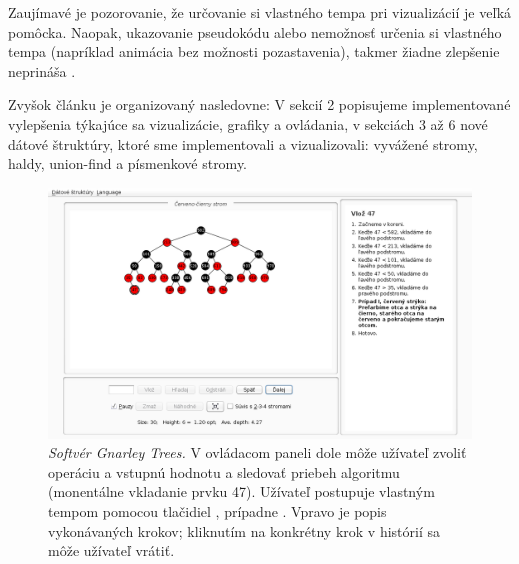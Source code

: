 Zaujímavé je pozorovanie, že určovanie si vlastného tempa pri vizualizácií 
je veľká pomôcka. Naopak, ukazovanie pseudokódu alebo nemožnosť určenia si
vlastného tempa (napríklad animácia bez možnosti pozastavenia), takmer 
žiadne zlepšenie neprináša \citep{shaffer,saraiya}.

Zvyšok článku je organizovaný nasledovne: V sekcií 2 popisujeme implementované
vylepšenia týkajúce sa vizualizácie, grafiky a ovládania, v sekciách 3 až 6
nové dátové štruktúry, ktoré sme implementovali a vizualizovali: vyvážené
stromy, haldy, union-find a písmenkové stromy.

\begin{figure}
\centering
\includegraphics[width=2.01\columnwidth]{obrazky/gt.png}
\caption{\emph{Softvér Gnarley Trees.} V ovládacom paneli dole môže užívateľ
zvoliť operáciu a vstupnú hodnotu a sledovať priebeh algoritmu (monentálne vkladanie
prvku 47). Užívateľ postupuje vlastným tempom  pomocou tlačidiel , prípadne
. Vpravo je popis vykonávaných krokov; kliknutím na konkrétny krok v histórií
sa môže užívateľ vrátiť.}
\label{img:historia} 
\end{figure}

